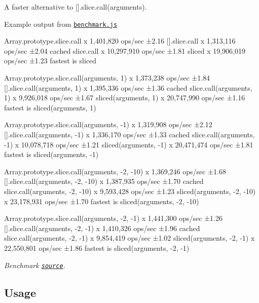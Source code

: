A faster alternative to {\ttfamily \mbox{[}\mbox{]}.slice.\+call(arguments)}.

\href{http://travis-ci.org/aheckmann/sliced}{\tt }

Example output from \href{https://github.com/bestiejs/benchmark.js}{\tt benchmark.\+js} \begin{DoxyVerb}Array.prototype.slice.call x 1,401,820 ops/sec ±2.16%
[].slice.call x 1,313,116 ops/sec ±2.04%
cached slice.call x 10,297,910 ops/sec ±1.81%
sliced x 19,906,019 ops/sec ±1.23%
fastest is sliced

Array.prototype.slice.call(arguments, 1) x 1,373,238 ops/sec ±1.84%
[].slice.call(arguments, 1) x 1,395,336 ops/sec ±1.36%
cached slice.call(arguments, 1) x 9,926,018 ops/sec ±1.67%
sliced(arguments, 1) x 20,747,990 ops/sec ±1.16%
fastest is sliced(arguments, 1)

Array.prototype.slice.call(arguments, -1) x 1,319,908 ops/sec ±2.12%
[].slice.call(arguments, -1) x 1,336,170 ops/sec ±1.33%
cached slice.call(arguments, -1) x 10,078,718 ops/sec ±1.21%
sliced(arguments, -1) x 20,471,474 ops/sec ±1.81%
fastest is sliced(arguments, -1)

Array.prototype.slice.call(arguments, -2, -10) x 1,369,246 ops/sec ±1.68%
[].slice.call(arguments, -2, -10) x 1,387,935 ops/sec ±1.70%
cached slice.call(arguments, -2, -10) x 9,593,428 ops/sec ±1.23%
sliced(arguments, -2, -10) x 23,178,931 ops/sec ±1.70%
fastest is sliced(arguments, -2, -10)

Array.prototype.slice.call(arguments, -2, -1) x 1,441,300 ops/sec ±1.26%
[].slice.call(arguments, -2, -1) x 1,410,326 ops/sec ±1.96%
cached slice.call(arguments, -2, -1) x 9,854,419 ops/sec ±1.02%
sliced(arguments, -2, -1) x 22,550,801 ops/sec ±1.86%
fastest is sliced(arguments, -2, -1)
\end{DoxyVerb}


{\itshape Benchmark \href{https://github.com/aheckmann/sliced/blob/master/bench.js}{\tt source}.}

\subsection*{Usage}

